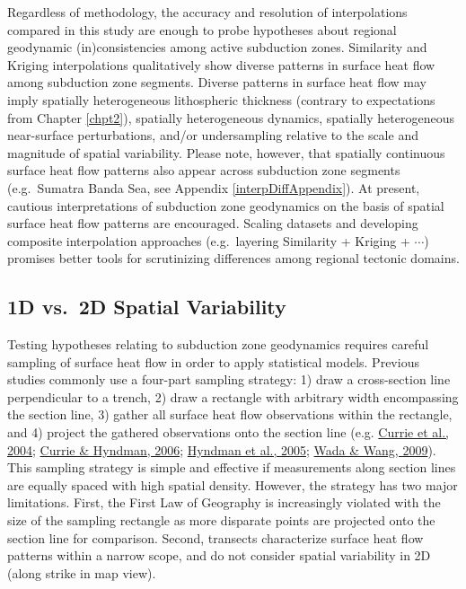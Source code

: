 Regardless of methodology, the accuracy and resolution of interpolations compared in this study are enough to probe hypotheses about regional geodynamic (in)consistencies among active subduction zones. Similarity and Kriging interpolations qualitatively show diverse patterns in surface heat flow among subduction zone segments. Diverse patterns in surface heat flow may imply spatially heterogeneous lithospheric thickness (contrary to expectations from Chapter \ref{chpt2}), spatially heterogeneous dynamics, spatially heterogeneous near-surface perturbations, and/or undersampling relative to the scale and magnitude of spatial variability. Please note, however, that spatially continuous surface heat flow patterns also appear across subduction zone segments (e.g.~Sumatra Banda Sea, see Appendix \ref{interpDiffAppendix}). At present, cautious interpretations of subduction zone geodynamics on the basis of spatial surface heat flow patterns are encouraged. Scaling datasets and developing composite interpolation approaches (e.g.~layering Similarity + Kriging + \(\cdots\)) promises better tools for scrutinizing differences among regional tectonic domains.

\hypertarget{d-vs.-2d-spatial-variability}{%
\subsection{1D vs.~2D Spatial Variability}\label{d-vs.-2d-spatial-variability}}

Testing hypotheses relating to subduction zone geodynamics requires careful sampling of surface heat flow in order to apply statistical models. Previous studies commonly use a four-part sampling strategy: 1) draw a cross-section line perpendicular to a trench, 2) draw a rectangle with arbitrary width encompassing the section line, 3) gather all surface heat flow observations within the rectangle, and 4) project the gathered observations onto the section line (e.g. \protect\hyperlink{ref-currie2004}{Currie et al., 2004}; \protect\hyperlink{ref-currie2006}{Currie \& Hyndman, 2006}; \protect\hyperlink{ref-hyndman2005}{Hyndman et al., 2005}; \protect\hyperlink{ref-wada2009}{Wada \& Wang, 2009}). This sampling strategy is simple and effective if measurements along section lines are equally spaced with high spatial density. However, the strategy has two major limitations. First, the First Law of Geography is increasingly violated with the size of the sampling rectangle as more disparate points are projected onto the section line for comparison. Second, transects characterize surface heat flow patterns within a narrow scope, and do not consider spatial variability in 2D (along strike in map view).

